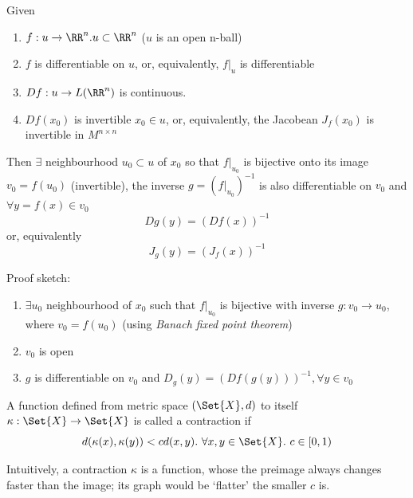 \begin{thm}
  Given
  \begin{enumerate}
  \item $f: u \to \RR^n. u \subset \RR^n$ ($u$ is an open n-ball)
  \item $f$ is differentiable on $u$, or, equivalently, $f|_u$ is differentiable
  \item $Df: u \to L(\RR^n)$ is continuous.
  \item $Df(x_0)$ is invertible $x_0 \in u$, or, equivalently, the Jacobean $J_f(x_0)$ is invertible in $M^{n\times n}$
  \end{enumerate}
  Then $\exists$ neighbourhood $u_0 \subset u$ of $x_0$ so that $f|_{u_0}$ is bijective onto its image $v_0 = f(u_0)$ (invertible), the inverse $g = (f|_{u_0})^{-1}$ is also differentiable on $v_0$ and $\forall y = f(x) \in v_0$
  $$Dg(y) = (Df(x))^{-1}$$
  or, equivalently
  $$J_g(y) = (J_f(x))^{-1}$$
\end{thm}

Proof sketch:
\begin{enumerate}[I]
\item $\exists u_0$ neighbourhood of $x_0$ such that $f|_{u_0}$ is bijective with inverse $g: v_0 \rightarrow u_0$, where $v_0 = f(u_0)$ (using \emph{Banach fixed point theorem})
\item $v_0$ is open
\item $g$ is differentiable on $v_0$ and $D_g(y) = (Df(g(y)))^{-1}, \forall y \in v_0$
\end{enumerate}

\begin{defn}
  A function defined from metric space $(\Set{X}, d)$ to itself $\kappa: \Set{X} \rightarrow \Set{X}$ is called a contraction if
  $$d(\kappa(x), \kappa(y)) < cd(x,y).\ \forall x, y \in \Set{X}.\ c \in [0, 1)$$
\end{defn}

\begin{rem}
  Intuitively, a contraction $\kappa$ is a function, whose the preimage always changes faster than the image; its graph would be `flatter' the smaller $c$ is.
\end{rem}


